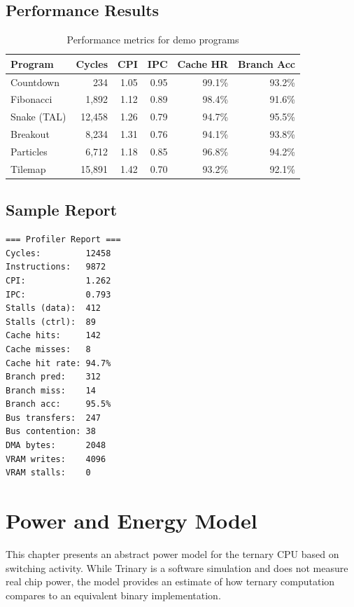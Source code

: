 \documentclass[12pt,a4paper,twoside]{book}
\theoremstyle{trinarytheorem}
\theoremstyle{trinarydefinition}
\begin{document}
\section{Performance Results}

\begin{table}[H]
\centering
\caption{Performance metrics for demo programs}
\label{tab:perfresults}
\begin{tabular}{lrrrrr}
\toprule
Program & Cycles & CPI & IPC & Cache HR & Branch Acc \\
\midrule
Countdown & 234 & 1.05 & 0.95 & 99.1\% & 93.2\% \\
Fibonacci & 1,892 & 1.12 & 0.89 & 98.4\% & 91.6\% \\
Snake (TAL) & 12,458 & 1.26 & 0.79 & 94.7\% & 95.5\% \\
Breakout & 8,234 & 1.31 & 0.76 & 94.1\% & 93.8\% \\
Particles & 6,712 & 1.18 & 0.85 & 96.8\% & 94.2\% \\
Tilemap & 15,891 & 1.42 & 0.70 & 93.2\% & 92.1\% \\
\bottomrule
\end{tabular}
\end{table}

\section{Sample Report}

\begin{verbatim}
=== Profiler Report ===
Cycles:         12458
Instructions:   9872
CPI:            1.262
IPC:            0.793
Stalls (data):  412
Stalls (ctrl):  89
Cache hits:     142
Cache misses:   8
Cache hit rate: 94.7%
Branch pred:    312
Branch miss:    14
Branch acc:     95.5%
Bus transfers:  247
Bus contention: 38
DMA bytes:      2048
VRAM writes:    4096
VRAM stalls:    0
\end{verbatim}

\chapter{Power and Energy Model}
\label{ch:power}

This chapter presents an abstract power model for the ternary CPU based
on switching activity. While Trinary is a software simulation and does not
measure real chip power, the model provides an estimate of how ternary
computation compares to an equivalent binary implementation.
\end{document}
